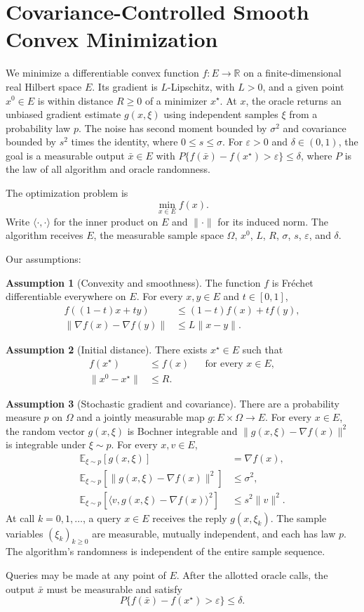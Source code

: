 \documentclass[10pt]{article}
\theoremstyle{definition}
\newtheorem{assumption}{Assumption}
\begin{document}
\section*{Covariance-Controlled Smooth Convex Minimization}
We minimize a differentiable convex function $f:E\to\mathbb{R}$ on a finite-dimensional real Hilbert space $E$. Its gradient is $L$-Lipschitz, with $L>0$, and a given point $x^0\in E$ is within distance $R\geq0$ of a minimizer $x^\star$. At $x$, the oracle returns an unbiased gradient estimate $g(x,\xi)$ using independent samples $\xi$ from a probability law $p$. The noise has second moment bounded by $\sigma^2$ and covariance bounded by $s^2$ times the identity, where $0\leq s\leq\sigma$. For $\varepsilon>0$ and $\delta\in(0,1)$, the goal is a measurable output $\bar{x}\in E$ with $P\{f(\bar{x})-f(x^\star)>\varepsilon\}\leq\delta$, where $P$ is the law of all algorithm and oracle randomness.

The optimization problem is
\[
\min_{x\in E} f(x).
\]
Write $\langle\cdot,\cdot\rangle$ for the inner product on $E$ and $\|\cdot\|$ for its induced norm. The algorithm receives $E$, the measurable sample space $\Omega$, $x^0$, $L$, $R$, $\sigma$, $s$, $\varepsilon$, and $\delta$.

Our assumptions:
\begin{assumption}[Convexity and smoothness]
The function $f$ is Fr\'echet differentiable everywhere on $E$. For every $x,y\in E$ and $t\in[0,1]$,
\[
\begin{aligned}
f((1-t)x+ty)&\leq(1-t)f(x)+tf(y),\\
\|\nabla f(x)-\nabla f(y)\|&\leq L\|x-y\|.
\end{aligned}
\]
\end{assumption}

\begin{assumption}[Initial distance]
There exists $x^\star\in E$ such that
\[
\begin{aligned}
f(x^\star)&\leq f(x) &&\text{for every }x\in E,\\
\|x^0-x^\star\|&\leq R.
\end{aligned}
\]
\end{assumption}

\begin{assumption}[Stochastic gradient and covariance]
There are a probability measure $p$ on $\Omega$ and a jointly measurable map $g:E\times\Omega\to E$. For every $x\in E$, the random vector $g(x,\xi)$ is Bochner integrable and $\|g(x,\xi)-\nabla f(x)\|^2$ is integrable under $\xi\sim p$. For every $x,v\in E$,
\[
\begin{aligned}
\mathbb{E}_{\xi\sim p}[g(x,\xi)]&=\nabla f(x),\\
\mathbb{E}_{\xi\sim p}\!\left[\|g(x,\xi)-\nabla f(x)\|^2\right]&\leq\sigma^2,\\
\mathbb{E}_{\xi\sim p}\!\left[\langle v,g(x,\xi)-\nabla f(x)\rangle^2\right]&\leq s^2\|v\|^2.
\end{aligned}
\]
At call $k=0,1,\ldots$, a query $x\in E$ receives the reply $g(x,\xi_k)$. The sample variables $(\xi_k)_{k\geq0}$ are measurable, mutually independent, and each has law $p$. The algorithm's randomness is independent of the entire sample sequence.
\end{assumption}

Queries may be made at any point of $E$. After the allotted oracle calls, the output $\bar{x}$ must be measurable and satisfy
\[
P\bigl\{f(\bar{x})-f(x^\star)>\varepsilon\bigr\}\leq\delta.
\]
\end{document}
